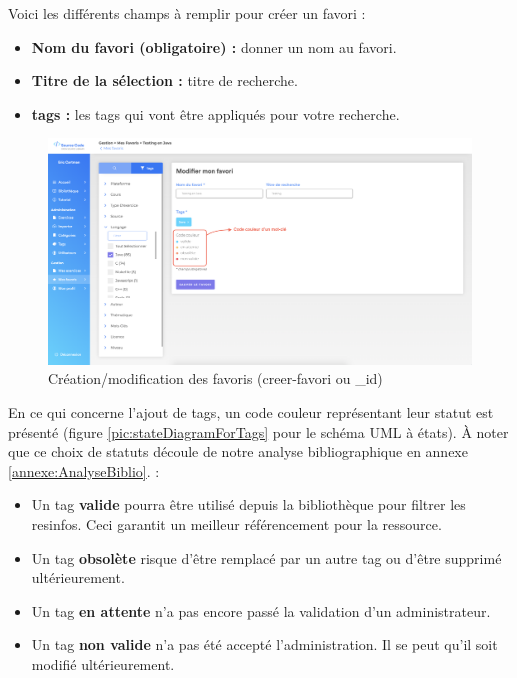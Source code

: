 
Voici les différents champs à remplir pour créer un favori :

\begin{itemize}
    \item \textbf{Nom du favori (obligatoire) :} donner un nom au favori.
    \item \textbf{Titre de la sélection :} titre de recherche.
    \item \textbf{\Glspl{tag} :} les tags qui vont être appliqués pour votre recherche.
\end{itemize}

\begin{figure}[H]
    \includegraphics[width=\textwidth,height=\textheight,keepaspectratio]{images/client/favorite-form.png}
    \caption[SourceCode : création/modification des favoris]{Création/modification des favoris (creer-favori ou \_id)}
    \centering
\end{figure}

En ce qui concerne l'ajout de \glspl{tag}, un code couleur représentant leur statut est présenté (figure \ref{pic:stateDiagramForTags} pour le schéma UML à états). À noter que ce choix de statuts découle de notre analyse bibliographique en annexe \ref{annexe:AnalyseBiblio}. :

\begin{itemize}
    \item Un \gls{tag} \textbf{valide} pourra être utilisé depuis la bibliothèque pour filtrer les \glspl{resinfo}. Ceci garantit un meilleur référencement pour la ressource.
    \item Un \gls{tag} \textbf{obsolète} risque d'être remplacé par un autre \gls{tag} ou d'être supprimé ultérieurement.
    \item Un \gls{tag} \textbf{en attente} n'a pas encore passé la validation d'un administrateur.
    \item Un \gls{tag} \textbf{non valide} n'a pas été accepté l'administration. Il se peut qu'il soit modifié ultérieurement.
\end{itemize}

